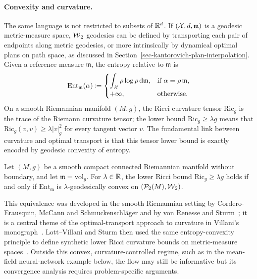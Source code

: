 \paragraph{Convexity and curvature.}

The same language is not restricted to subsets of $\mathbb{R}^d$. If $(\mathcal{X},d,\mathfrak m)$ is a geodesic metric-measure space, $\operatorname{\mathcal{W}}_2$ geodesics can be defined by transporting each pair of endpoints along metric geodesics, or more intrinsically by dynamical optimal plans on path space, as discussed in Section~\ref{sec-kantorovich-plan-interpolation}. Given a reference measure $\mathfrak m$, the entropy relative to $\mathfrak m$ is
\[
	\mathrm{Ent}_{\mathfrak m}(\alpha)
	\coloneqq
	\begin{cases}
		\displaystyle \int_{\mathcal{X}} \rho\log\rho\,\mathrm{d}\mathfrak m,
		& \text{if } \alpha=\rho\,\mathfrak m,\\
		+\infty,
		& \text{otherwise.}
	\end{cases}
\]
On a smooth Riemannian manifold $(M,g)$, the Ricci curvature tensor $\mathrm{Ric}_g$ is the trace of the Riemann curvature tensor; the lower bound $\mathrm{Ric}_g\geq\lambda g$ means that $\mathrm{Ric}_g(v,v)\geq\lambda |v|_g^2$ for every tangent vector $v$. The fundamental link between curvature and optimal transport is that this tensor lower bound is exactly encoded by geodesic convexity of entropy.

\begin{thm}\label{thm-ricci-entropy-convexity}
	Let $(M,g)$ be a smooth compact connected Riemannian manifold without boundary, and let $\mathfrak m=\mathrm{vol}_g$. For $\lambda\in\mathbb{R}$, the lower Ricci bound $\mathrm{Ric}_g\geq\lambda g$ holds if and only if $\mathrm{Ent}_{\mathfrak m}$ is $\lambda$-geodesically convex on $(\mathcal{P}_2(M),\operatorname{\mathcal{W}}_2)$.
\end{thm}

This equivalence was developed in the smooth Riemannian setting by Cordero-Erausquin, McCann and Schmuckenschl{\"a}ger and by von Renesse and Sturm~\cite{cordero2001riemannian,vonrenesse2005transport}; it is a central theme of the optimal-transport approach to curvature in Villani's monograph~\cite{Villani09}. Lott--Villani and Sturm then used the same entropy-convexity principle to define synthetic lower Ricci curvature bounds on metric-measure spaces~\cite{lott2009ricci,sturm2006geometry1,sturm2006geometry2}. Outside this convex, curvature-controlled regime, such as in the mean-field neural-network example below, the flow may still be informative but its convergence analysis requires problem-specific arguments.


